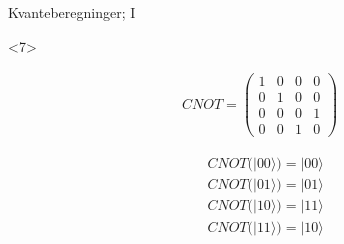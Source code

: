 \documentclass[norsk]{beamer}
\begin{document}
\begin{frame}{Kvanteberegninger; I}
\begin{itemize}
			\begin{onlyenv}<7>
				\begin{minipage}{0.35\textwidth}
					\begin{align*}
						CNOT = \begin{pmatrix*}
							1 & 0 & 0 & 0 \\
							0 & 1 & 0 & 0 \\
							0 & 0 & 0 & 1 \\
							0 & 0 & 1 & 0
						\end{pmatrix*}
					\end{align*}
				\end{minipage}
				\begin{minipage}{0.35\textwidth}
					\begin{align*}
						& CNOT(|00\rangle) = |00\rangle \\
						& CNOT(|01\rangle) = |01\rangle \\
						& CNOT(|10\rangle) = |11\rangle \\
						& CNOT(|11\rangle) = |10\rangle
					\end{align*}
				\end{minipage}
			\end{onlyenv}

		\end{itemize}
	\end{frame}
\end{document}
